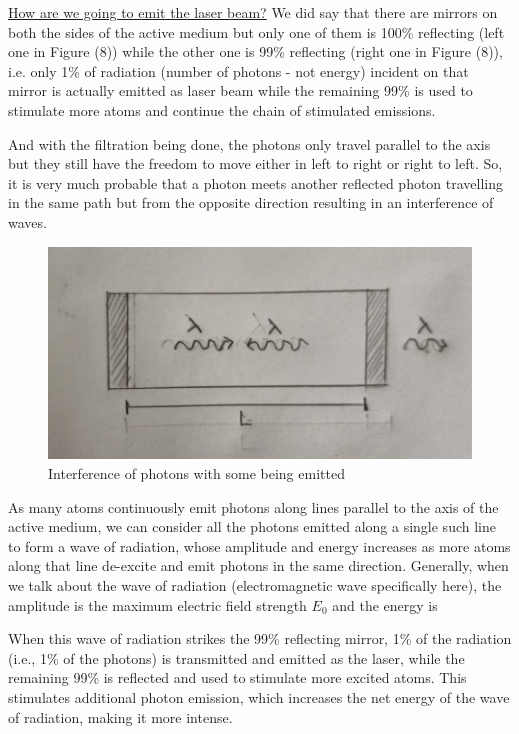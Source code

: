 \documentclass[12pt]{article}
\begin{document}
\uline{How are we going to emit the laser beam?} We did say that there are mirrors on both the sides of the active medium but only one of them is 100\% reflecting (left one in Figure (8)) while the other one is 99\% reflecting (right one in Figure (8)), i.e. only 1\% of radiation (number of photons - not energy) incident on that mirror is actually emitted as laser beam while the remaining 99\% is used to stimulate more atoms and continue the chain of stimulated emissions. \vspace{.2cm}

And with the filtration being done, the photons only travel parallel to the axis but they still have the freedom to move either in left to right or right to left. So, it is very much probable that a photon meets another reflected photon travelling in the same path but from the opposite direction resulting in an interference of waves. \vspace{.2cm}

\begin{figure}[H]
    \centering
    \includegraphics[scale=.8]{./img/13.1_meeting_waves.png}
    \caption{Interference of photons with some being emitted}
\end{figure}

As many atoms continuously emit photons along lines parallel to the axis of the active medium, we can consider all the photons emitted along a single such line to form a wave of radiation, whose amplitude and energy increases as more atoms along that line de-excite and emit photons in the same direction. Generally, when we talk about the wave of radiation (electromagnetic wave specifically here), the amplitude is the maximum electric field strength $E_0$ and the energy is  \vspace{.2cm}

When this wave of radiation strikes the 99\% reflecting mirror, 1\% of the radiation (i.e., 1\% of the photons) is transmitted and emitted as the laser, while the remaining 99\% is reflected and used to stimulate more excited atoms. This stimulates additional photon emission, which increases the net energy of the wave of radiation, making it more intense. \vspace{.2cm}
\end{document}

